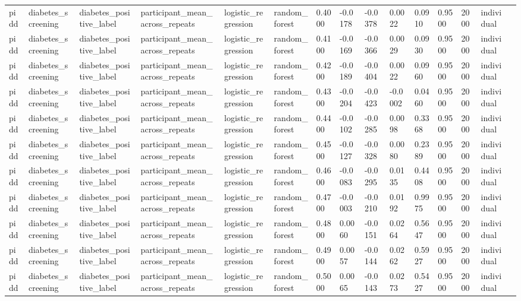 \begin{tabular}{lllllllllllllll}
pidd & diabetes\_screening & diabetes\_positive\_label & participant\_mean\_across\_repeats & logistic\_regression & random\_forest & 0.4000 & -0.0178 & -0.0378 & 0.0022 & 0.0910 & 0.9500 & 2000 & individual &  \\
pidd & diabetes\_screening & diabetes\_positive\_label & participant\_mean\_across\_repeats & logistic\_regression & random\_forest & 0.4100 & -0.0169 & -0.0366 & 0.0029 & 0.0930 & 0.9500 & 2000 & individual &  \\
pidd & diabetes\_screening & diabetes\_positive\_label & participant\_mean\_across\_repeats & logistic\_regression & random\_forest & 0.4200 & -0.0189 & -0.0404 & 0.0022 & 0.0960 & 0.9500 & 2000 & individual &  \\
pidd & diabetes\_screening & diabetes\_positive\_label & participant\_mean\_across\_repeats & logistic\_regression & random\_forest & 0.4300 & -0.0204 & -0.0423 & -0.0002 & 0.0460 & 0.9500 & 2000 & individual &  \\
pidd & diabetes\_screening & diabetes\_positive\_label & participant\_mean\_across\_repeats & logistic\_regression & random\_forest & 0.4400 & -0.0102 & -0.0285 & 0.0098 & 0.3368 & 0.9500 & 2000 & individual &  \\
pidd & diabetes\_screening & diabetes\_positive\_label & participant\_mean\_across\_repeats & logistic\_regression & random\_forest & 0.4500 & -0.0127 & -0.0328 & 0.0080 & 0.2389 & 0.9500 & 2000 & individual &  \\
pidd & diabetes\_screening & diabetes\_positive\_label & participant\_mean\_across\_repeats & logistic\_regression & random\_forest & 0.4600 & -0.0083 & -0.0295 & 0.0135 & 0.4408 & 0.9500 & 2000 & individual &  \\
pidd & diabetes\_screening & diabetes\_positive\_label & participant\_mean\_across\_repeats & logistic\_regression & random\_forest & 0.4700 & -0.0003 & -0.0210 & 0.0192 & 0.9975 & 0.9500 & 2000 & individual &  \\
pidd & diabetes\_screening & diabetes\_positive\_label & participant\_mean\_across\_repeats & logistic\_regression & random\_forest & 0.4800 & 0.0060 & -0.0151 & 0.0264 & 0.5647 & 0.9500 & 2000 & individual &  \\
pidd & diabetes\_screening & diabetes\_positive\_label & participant\_mean\_across\_repeats & logistic\_regression & random\_forest & 0.4900 & 0.0057 & -0.0144 & 0.0262 & 0.5927 & 0.9500 & 2000 & individual &  \\
pidd & diabetes\_screening & diabetes\_positive\_label & participant\_mean\_across\_repeats & logistic\_regression & random\_forest & 0.5000 & 0.0065 & -0.0143 & 0.0273 & 0.5427 & 0.9500 & 2000 & individual &  \\

\end{tabular}
